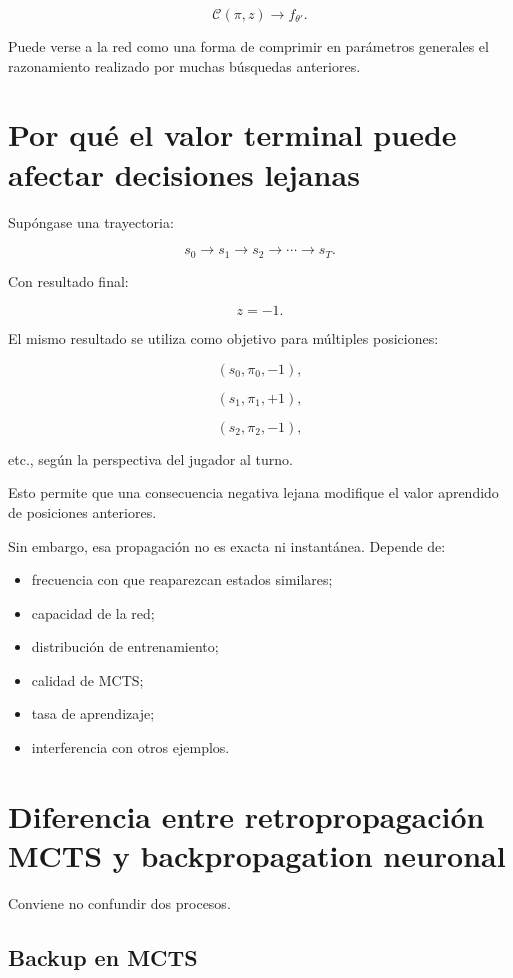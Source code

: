 \documentclass[11pt,a4paper]{article}
\begin{document}
\[
\mathcal{C}(\pi,z)
\rightarrow
f_{\theta'}.
\]

Puede verse a la red como una forma de comprimir en parámetros generales el razonamiento realizado por muchas búsquedas anteriores.

\section{Por qué el valor terminal puede afectar decisiones lejanas}

Supóngase una trayectoria:

\[
s_0
\rightarrow
s_1
\rightarrow
s_2
\rightarrow
\cdots
\rightarrow
s_T.
\]

Con resultado final:

\[
z=-1.
\]

El mismo resultado se utiliza como objetivo para múltiples posiciones:

\[
(s_0,\pi_0,-1),
\]

\[
(s_1,\pi_1,+1),
\]

\[
(s_2,\pi_2,-1),
\]

etc., según la perspectiva del jugador al turno.

Esto permite que una consecuencia negativa lejana modifique el valor aprendido de posiciones anteriores.

Sin embargo, esa propagación no es exacta ni instantánea. Depende de:

\begin{itemize}
    \item frecuencia con que reaparezcan estados similares;
    \item capacidad de la red;
    \item distribución de entrenamiento;
    \item calidad de MCTS;
    \item tasa de aprendizaje;
    \item interferencia con otros ejemplos.
\end{itemize}

\section{Diferencia entre retropropagación MCTS y backpropagation neuronal}

Conviene no confundir dos procesos.

\subsection{Backup en MCTS}
\end{document}
